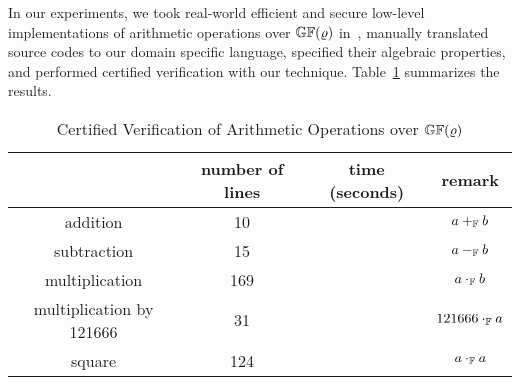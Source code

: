 
In our experiments, we took real-world efficient and secure
low-level implementations of arithmetic operations over
$\mathbb{GF}(\varrho)$ in~, manually translated source
codes to our domain specific language, specified their algebraic
properties, and performed certified verification with our technique. 
Table~\ref{table:arithmetic-operations} summarizes the results.


\begin{table}[ht]
  \caption{Certified Verification of Arithmetic Operations over
    $\mathbb{GF}(\varrho)$}
  \centering
  \begin{tabular}{|c|c|c|c|}
    \hline
             & number of lines & time (seconds) & remark\\
    \hline
    addition & 10 &                       & $a +_{\mathbb{F}} b$ \\
    \hline
    subtraction & 15 &                    & $a -_{\mathbb{F}} b$ \\
    \hline
    multiplication & 169 &                & $a \cdot_{\mathbb{F}} b$\\
    \hline
    multiplication by 121666 & 31 &       & $121666 \cdot_{\mathbb{F}} a$\\
    \hline
    square & 124 &                        & $a \cdot_{\mathbb{F}} a$\\
    \hline
  \end{tabular}
  \label{table:arithmetic-operations}
\end{table}


